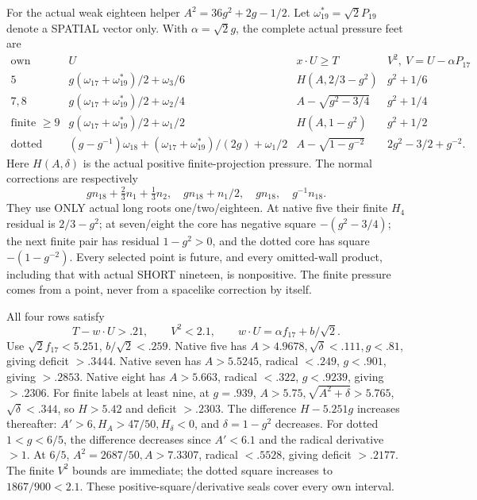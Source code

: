 \documentclass[11pt]{article}
\theoremstyle{definition}
\theoremstyle{remark}
\begin{document}
For the actual weak eighteen
helper \(A^2=36g^2+2g-1/2\).
Let \(\omega_{19}^*=\sqrt2P_{19}\)
denote a SPATIAL vector only.
With \(\alpha=\sqrt2g\), the
complete actual pressure feet
are
\[
\begin{array}{c|c|c|c}
 \text{own}&U&x\cdot U\ge T&V^2,\ V=U-\alpha P_{17}\\ \hline
 5&g(\omega_{17}+\omega_{19}^*)/2+\omega_3/6&
          H(A,2/3-g^2)&g^2+1/6\\
 7,8&g(\omega_{17}+\omega_{19}^*)/2+\omega_2/4&
          A-\sqrt{g^2-3/4}&g^2+1/4\\
 \text{finite }\ge9&
       g(\omega_{17}+\omega_{19}^*)/2+\omega_1/2&
          H(A,1-g^2)&g^2+1/2\\
 \text{dotted}&
       (g-g^{-1})\omega_{18}
          +(\omega_{17}+\omega_{19}^*)/(2g)+\omega_1/2&
          A-\sqrt{1-g^{-2}}&2g^2-3/2+g^{-2}.
\end{array}
\]
Here \(H(A,\delta)\) is the actual
positive finite-projection pressure.
The normal corrections are respectively
\[
 g n_{18}+\tfrac23n_1+\tfrac13n_2,\quad
 g n_{18}+n_1/2,\quad
 g n_{18},\quad
 g^{-1}n_{18}.
\]
They use ONLY actual long roots
one/two/eighteen.
At native five their finite
\(H_4\) residual is \(2/3-g^2\);
at seven/eight the core has
negative square \(-(g^2-3/4)\);
the next finite pair has residual
\(1-g^2>0\), and the dotted core
has square \(-(1-g^{-2})\).
Every selected point is future,
and every omitted-wall product,
including that with actual SHORT
nineteen, is nonpositive.
The finite pressure comes from
a point, never from a spacelike
correction by itself.

All four rows satisfy
\[
          T-w\cdot U>.21,\qquad V^2<2.1,\qquad
                w\cdot U=\alpha f_{17}+b/\sqrt2 .
\tag{B19helper18}\label{app:exact19:eq:Bhelper18}
\]
Use \(\sqrt2f_{17}<5.251\),
\(b/\sqrt2<.259\).
Native five has
\(A>4.9678,\sqrt\delta<.111,g<.81\),
giving deficit \(>.3444\).
Native seven has
\(A>5.5245\), radical \(<.249\),
\(g<.901\), giving \(>.2853\).
Native eight has
\(A>5.663\), radical \(<.322\),
\(g<.9239\), giving \(>.2306\).
For finite labels at least nine,
at \(g=.939\),
\(A>5.75,\sqrt{A^2+\delta}>5.765\),
\(\sqrt\delta<.344\), so
\(H>5.42\) and deficit \(>.2303\).
The difference \(H-5.251g\)
increases thereafter:
\(A'>6,H_A>47/50,H_\delta<0\),
and \(\delta=1-g^2\) decreases.
For dotted \(1<g<6/5\),
the difference decreases since
\(A'<6.1\) and the radical
derivative \(>1\).
At \(6/5\),
\(A^2=2687/50,A>7.3307\),
radical \(<.5528\), giving
deficit \(>.2177\).
The finite \(V^2\) bounds are
immediate; the dotted square
increases to \(1867/900<2.1\).
These positive-square/derivative
seals cover every own interval.
\end{document}
